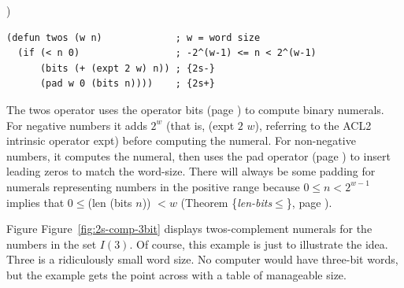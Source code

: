 \label{twos-defun}
)
\begin{Verbatim}
(defun twos (w n)             ; w = word size
  (if (< n 0)                 ; -2^(w-1) <= n < 2^(w-1)
      (bits (+ (expt 2 w) n)) ; {2s-}
      (pad w 0 (bits n))))    ; {2s+}
\end{Verbatim}

The twos operator uses the operator bits (page \pageref{bits-defun})
to compute binary numerals.
For negative numbers it adds $2^w$
(that is, (expt $2$ $w$), referring to the ACL2 intrinsic operator expt)
before computing the numeral.
For non-negative numbers, it computes the numeral,
then uses the pad operator (page \pageref{pad-defun})
to insert leading zeros to match the word-size.
There will always be some padding for numerals representing
numbers in the positive range because
$0 \le n < 2^{w-1}$ implies that
$0 \le $(len (bits $n$)) $< w$
(Theorem \{\emph{len-bits}$\le$\}, page \pageref{len-bitsLE}).

Figure Figure~\ref{fig:2s-comp-3bit} displays
twos-complement numerals for the numbers in the set $I(3)$.
Of course, this example is just to illustrate the idea.
Three is a ridiculously small word size.
No computer would have three-bit words,
but the example gets the point across with a table of manageable size.

